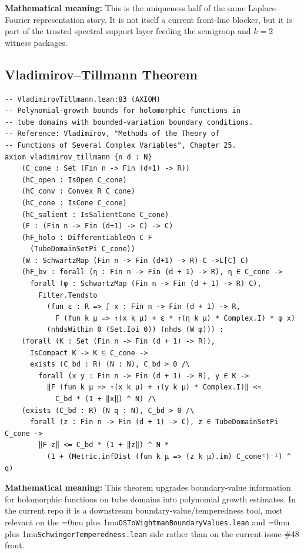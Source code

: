 \documentclass[11pt,a4paper]{article}
\newcommand{\leanfile}[1]{\begingroup\Urlmuskip=0mu plus 1mu\relax\nolinkurl{#1}\endgroup}
\begin{document}
\noindent\textbf{Mathematical meaning:}
This is the uniqueness half of the same Laplace--Fourier representation story.
It is not itself a current front-line blocker, but it is part of the trusted
spectral support layer feeding the semigroup and $k=2$ witness packages.

\subsection{Vladimirov--Tillmann Theorem}

\begin{lstlisting}[style=leanaxiom]
-- VladimirovTillmann.lean:83 (AXIOM)
-- Polynomial-growth bounds for holomorphic functions in
-- tube domains with bounded-variation boundary conditions.
-- Reference: Vladimirov, "Methods of the Theory of
-- Functions of Several Complex Variables", Chapter 25.
axiom vladimirov_tillmann {n d : N}
    (C_cone : Set (Fin n -> Fin (d+1) -> R))
    (hC_open : IsOpen C_cone)
    (hC_conv : Convex R C_cone)
    (hC_cone : IsCone C_cone)
    (hC_salient : IsSalientCone C_cone)
    (F : (Fin n -> Fin (d+1) -> C) -> C)
    (hF_holo : DifferentiableOn C F
      (TubeDomainSetPi C_cone))
    (W : SchwartzMap (Fin n -> Fin (d+1) -> R) C ->L[C] C)
    (hF_bv : forall (η : Fin n -> Fin (d + 1) -> R), η ∈ C_cone ->
      forall (φ : SchwartzMap (Fin n -> Fin (d + 1) -> R) C),
        Filter.Tendsto
          (fun ε : R => ∫ x : Fin n -> Fin (d + 1) -> R,
            F (fun k μ => ↑(x k μ) + ε * ↑(η k μ) * Complex.I) * φ x)
          (nhdsWithin 0 (Set.Ioi 0)) (nhds (W φ))) :
    (forall (K : Set (Fin n -> Fin (d + 1) -> R)),
      IsCompact K -> K ⊆ C_cone ->
      exists (C_bd : R) (N : N), C_bd > 0 /\
        forall (x y : Fin n -> Fin (d + 1) -> R), y ∈ K ->
          ‖F (fun k μ => ↑(x k μ) + ↑(y k μ) * Complex.I)‖ <=
            C_bd * (1 + ‖x‖) ^ N) /\
    (exists (C_bd : R) (N q : N), C_bd > 0 /\
      forall (z : Fin n -> Fin (d + 1) -> C), z ∈ TubeDomainSetPi C_cone ->
        ‖F z‖ <= C_bd * (1 + ‖z‖) ^ N *
          (1 + (Metric.infDist (fun k μ => (z k μ).im) C_coneᶜ)⁻¹) ^ q)
\end{lstlisting}

\noindent\textbf{Mathematical meaning:}
This theorem upgrades boundary-value information for holomorphic functions on
tube domains into polynomial growth estimates. In the current repo it is a
downstream boundary-value/temperedness tool, most relevant on the
\leanfile{OSToWightmanBoundaryValues.lean} and \leanfile{SchwingerTemperedness.lean}
side rather than on the current issue-\#48 front.
\end{document}
